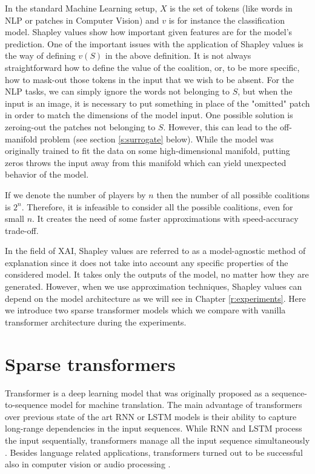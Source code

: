 \documentclass[magisterska,en]{pracamgr}
\begin{document}
In the standard Machine Learning setup, $X$ is the set of tokens (like words in NLP or patches in Computer Vision) and $v$ is for instance the classification model. Shapley values show how important given features are for the model's prediction. One of the important issues with the application of Shapley values is the way of defining $v(S)$ in the above definition. It is not always straightforward how to define the value of the coalition, or, to be more specific, how to mask-out those tokens in the input that we wish to be absent. For the NLP tasks, we can simply ignore the words not belonging to $S$, but when the input is an image, it is necessary to put something in place of the "omitted" patch in order to match the dimensions of the model input. One possible solution is zeroing-out the patches not belonging to $S$. However, this can lead to the off-manifold problem (see section \ref{s:surrogate} below). While the model was originally trained to fit the data on some high-dimensional manifold, putting zeros throws the input away from this manifold which can yield unexpected behavior of the model.



If we denote the number of players by $n$ then the number of all possible coalitions is $2^n$. Therefore, it is infeasible to consider all the possible coalitions, even for small $n$. It creates the need of some faster approximations with speed-accuracy trade-off.


In the field of XAI, Shapley values are referred to as a model-agnostic method of explanation since it does not take into account any specific properties of the considered model. It takes only the outputs of the model, no matter how they are generated. However, when we use approximation techniques, Shapley values can depend on the model architecture as we will see in Chapter \ref{r:experiments}. Here we introduce two sparse transformer models which we compare with vanilla transformer architecture during the experiments.







\section{Sparse transformers}
Transformer \cite{DBLP:conf/nips/VaswaniSPUJGKP17} is a deep learning model that was originally proposed as a sequence-to-sequence model \cite{DBLP:conf/nips/SutskeverVL14} for machine translation. The main advantage of transformers over previous state of the art RNN or LSTM models is their ability to capture long-range dependencies in the input sequences. While RNN and LSTM process the input sequentially, transformers manage all the input sequence simultaneously \cite{DBLP:journals/corr/abs-2306-07303}.
Besides language related applications, transformers turned out to be successful also in computer vision \cite{DBLP:conf/iclr/DosovitskiyB0WZ21} or audio processing \cite{DBLP:journals/corr/abs-2106-04554}. 
\end{document}
